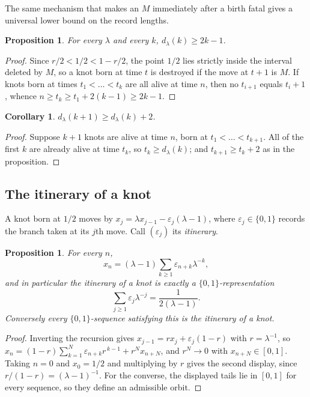 \documentclass[11pt,reqno]{amsart}
\theoremstyle{plain}
\newtheorem{proposition}[theorem]{Proposition}
\newtheorem{corollary}[theorem]{Corollary}
\theoremstyle{definition}
\theoremstyle{remark}
\begin{document}
The same mechanism that makes an $M$ immediately after a birth fatal gives a
universal lower bound on the record lengths.

\begin{proposition}\label{prop:lowerbound}
For every $\lambda$ and every $k$, $d_\lambda(k)\geq 2k-1$.
\end{proposition}

\begin{proof}
Since $r/2<1/2<1-r/2$, the point $1/2$ lies strictly inside the interval
deleted by $M$, so a knot born at time $t$ is destroyed if the move at $t+1$ is
$M$. If knots born at times $t_1<\dots<t_k$ are all alive at time $n$, then no
$t_{i+1}$ equals $t_i+1$, whence $n\geq t_k\geq t_1+2(k-1)\geq 2k-1$.
\end{proof}

\begin{corollary}\label{cor:recursive}
$d_\lambda(k+1)\geq d_\lambda(k)+2$.
\end{corollary}

\begin{proof}
Suppose $k+1$ knots are alive at time $n$, born at $t_1<\dots<t_{k+1}$. All of
the first $k$ are already alive at time $t_k$, so $t_k\geq d_\lambda(k)$; and
$t_{k+1}\geq t_k+2$ as in the proposition.
\end{proof}

\subsection{The itinerary of a knot}

A knot born at $1/2$ moves by $x_j=\lambda x_{j-1}-\varepsilon_j(\lambda-1)$,
where $\varepsilon_j\in\{0,1\}$ records the branch taken at its $j$th move. Call
$(\varepsilon_j)$ its \emph{itinerary}.

\begin{proposition}\label{prop:itinerary}
For every $n$,
\[
  x_n=(\lambda-1)\sum_{k\geq1}\varepsilon_{n+k}\lambda^{-k},
\]
and in particular the itinerary of a knot is exactly a $\{0,1\}$-representation
\[
  \sum_{j\geq1}\varepsilon_j\lambda^{-j}=\frac1{2(\lambda-1)} .
\]
Conversely every $\{0,1\}$-sequence satisfying this is the itinerary of a knot.
\end{proposition}

\begin{proof}
Inverting the recursion gives $x_{j-1}=r x_j+\varepsilon_j(1-r)$ with
$r=\lambda^{-1}$, so $x_n=(1-r)\sum_{k=1}^{N}\varepsilon_{n+k}r^{\,k-1}+r^Nx_{n+N}$,
and $r^N\to0$ with $x_{n+N}\in[0,1]$. Taking $n=0$ and $x_0=1/2$ and multiplying
by $r$ gives the second display, since $r/(1-r)=(\lambda-1)^{-1}$. For the
converse, the displayed tails lie in $[0,1]$ for every sequence, so they define
an admissible orbit.
\end{proof}
\end{document}
